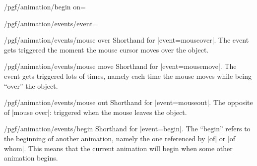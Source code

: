 \begin{key}{/pgf/animation/begin on=}
\begin{key}{/pgf/animation/events/event=}
\begin{key}{/pgf/animation/events/mouse over}
      Shorthand for |event=mouseover|. The event gets triggered the
      moment the mouse cursor moves over the object.
\begin{codeexample}[width=2cm]
\end{codeexample}
    \end{key}
    \begin{key}{/pgf/animation/events/mouse move}
      Shorthand for |event=mousemove|. The event gets triggered lots
      of times, namely each time the mouse moves while being ``over''
      the object.
\begin{codeexample}[width=2cm]
\end{codeexample}
    \end{key}
    \begin{key}{/pgf/animation/events/mouse out}
      Shorthand for |event=mouseout|. The opposite of |mouse over|:
      triggered when the mouse leaves the object.
\begin{codeexample}[width=2cm]
\end{codeexample}
    \end{key}
    \begin{key}{/pgf/animation/events/begin}
      Shorthand for |event=begin|. The ``begin'' refers to the
      beginning of another animation, namely the one referenced by
      |of| or |of whom|. This means that the current animation will
      begin when some other animation begins.
\begin{codeexample}[width=2cm]
\end{codeexample}
    \end{key}

\end{key}
\end{key}
